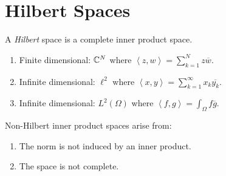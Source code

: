 \documentclass[letterpaper,12pt,fleqn]{article}
\newcommand{\inner}[2]{\left<#1,#2\right>}
\newcommand{\conj}[1]{\overline{#1}}
\renewcommand{\O}{\Omega}
\begin{document}
\section*{Hilbert Spaces}

\begin{definition}
  A \emph{Hilbert} space is a complete inner product space.
\end{definition}

\begin{examples}
  \listbreak
  \begin{enumerate}
  \item Finite dimensional: $\mathbb{C}^N$ where $\inner{z}{w}=\sum_{k=1}^Nz\conj{w}$.

  \item Infinite dimensional: $\ell^2$ where
    $\inner{x}{y}=\sum_{k=1}^{\infty}x_k\conj{y_k}$.

  \item Infinite dimensional: $L^2(\O)$ where
    $\inner{f}{g}=\int_{\O}f\conj{g}$.
  \end{enumerate}
\end{examples}

Non-Hilbert inner product spaces arise from:
\begin{enumerate}
\item The norm is not induced by an inner product.
\item The space is not complete.
\end{enumerate}
\end{document}
